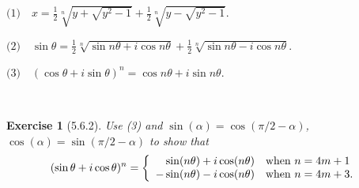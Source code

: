 \documentclass[12pt]{article}
\newcommand{\XB}{\color{black}}
\newcommand{\XBB}{\color{blue}}
\newcommand{\ds}{\displaystyle}
\theoremstyle{plain}
\newtheorem{ex}{Exercise}
\begin{document}
\newpage


$ \textit{(1)} \quad \ds x = \frac{1}{2} \sqrt[n]{ \ds y + \sqrt{ y^{2} - 1 } } + \frac{1}{2} \sqrt[n]{ \ds y - \sqrt{ y^{2} - 1 } } $.

$ \textit{(2)} \quad \ds \sin{\theta} = \frac{1}{2} \sqrt[n]{ \sin{n\theta} + i\cos{n\theta} } + \frac{1}{2} \sqrt[n]{ \sin{n\theta} - i\cos{n\theta} } $.

$ \textit{(3)} \quad \ds ( \cos{\theta} + i\sin{\theta} )^{n} = \cos{n\theta} + i\sin{n\theta} $.

\XBB\hrulefill\XB \\
\begin{ex} [5.6.2]
  Use (3) and $ \sin(\alpha) = \cos(\pi/2 - \alpha) $, $ \cos(\alpha )= \sin(\pi/2 - \alpha) $ to show that
  \[
    (\sin\theta + i\cos\theta)^{n} =
    \left\{ \begin{array}{rl}
       \sin(n\theta) + i\cos(n\theta) & \mbox{when $ n = 4m + 1 $} \\
      -\sin(n\theta) - i\cos(n\theta) & \mbox{when $ n = 4m + 3 $.}
    \end{array} \right.
  \]
\end{ex}
\XBB\hrulefill\XB \\
\end{document}
